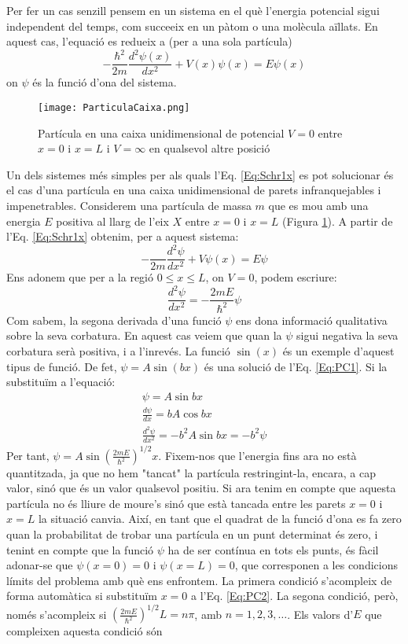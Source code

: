 Per fer un cas senzill pensem en un sistema en el què l'energia potencial sigui independent del temps, com succeeix en un pàtom o una molècula aïllats. En aquest cas, l'equació es redueix a (per a una sola partícula)
\[
-\frac{\hbar^2}{2m}\frac{d^2 \psi(x)}{dx^2}+V(x)\psi(x)=E\psi(x)
\label{Eq:Schr1x}
\]
on $\psi$ és la funció d'ona del sistema.
\begin{figure}[h]
\centering
\texttt{[image: ParticulaCaixa.png]}
\caption{Partícula en una caixa unidimensional de potencial $V=0$ entre $x=0$ i $x=L$ i $V=\infty$ en qualsevol altre posició}
\label{fig:ParticulaCaixa}
\end{figure}
\begin{mdframed}[backgroundcolor=gray!30,frametitle=Partícula en una caixa]
Un dels sistemes més simples per als quals l'Eq. \ref{Eq:Schr1x} es pot solucionar és el cas d'una partícula en una caixa unidimensional de parets infranquejables i impenetrables.
Considerem una partícula de massa $m$ que es mou amb una energia $E$ positiva al llarg de l'eix $X$ entre $x=0$ i $x=L$ (Figura \ref{fig:ParticulaCaixa}).
A partir de l'Eq. \ref{Eq:Schr1x} obtenim, per a aquest sistema:
\[
-\frac{}{2m}\frac{d^2 \psi}{dx^2}+V\psi(x)=E\psi
\]
Ens adonem que per a la regió $0\leq x \leq L$, on $V=0$, podem escriure:
 \[
\frac{d^2 \psi}{dx^2}=-\frac{2mE}{\hbar^2}\psi
\label{Eq:PC1}
\]
Com sabem, la segona derivada d'una funció $\psi$ ens dona informació qualitativa sobre la seva corbatura. En aquest cas veiem que quan la $\psi$ sigui negativa la seva corbatura serà positiva, i a l'inrevés. La funció $\sin(x)$ és un exemple d'aquest tipus de funció. De fet, $\psi=A \sin(bx)$ és una solució de l'Eq. \ref{Eq:PC1}. Si la substituïm a l'equació:
\begin{eqnarray*}
\psi = A \sin{bx} \\
\frac{d \psi}{d x} = bA \cos{bx} \\
\frac{d^2 \psi}{dx^2}=-b^2A \sin{bx}=-b^2 \psi
\label{Eq:PC2}
\end{eqnarray*}
Per tant, $\psi=A \sin{\left( \frac{2mE}{\hbar^2}\right)^{1/2} x}$. Fixem-nos que l'energia fins ara no està quantitzada, ja que no hem "tancat" la partícula restringint-la, encara, a cap valor, sinó que és un valor qualsevol positiu. Si ara tenim en compte que aquesta partícula no és lliure de moure's sinó que està tancada entre les parets $x=0$ i $x=L$ la situació canvia. Així, en tant que el quadrat de la funció d'ona es fa zero quan la probabilitat de trobar una partícula en un punt determinat és zero, i tenint en compte que la funció $\psi$ ha de ser contínua en tots els punts, és fàcil adonar-se que $\psi(x=0)=0$ i $\psi(x=L)=0$, que corresponen a les condicions límits del problema amb què ens enfrontem. La primera condició s'acompleix de forma automàtica si substituïm $x=0$ a l'Eq. \ref{Eq:PC2}. La segona condició, però, només s'acompleix si $\left( \frac{2mE}{\hbar^2}\right)^{1/2} L=n \pi$, amb $n=1,2,3,\ldots$. Els valors d'$E$ que compleixen aquesta condició són 

\end{mdframed}
